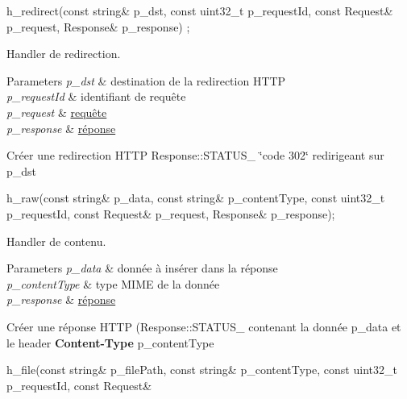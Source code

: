 \begin{DoxyItemize}
\item 
\begin{DoxyCode}
h\_redirect(\textcolor{keyword}{const} \textcolor{keywordtype}{string}& p\_dst, \textcolor{keyword}{const} uint32\_t p\_requestId, \textcolor{keyword}{const} Request& p\_request, Response& p\_response)
      ; 
\end{DoxyCode}
 Handler de redirection. 
\begin{DoxyParams}{Parameters}
{\em p\-\_\-dst} & destination de la redirection H\-T\-T\-P \\
\hline
{\em p\-\_\-request\-Id} & identifiant de requête \\
\hline
{\em p\-\_\-request} & \hyperlink{classxtd_1_1network_1_1http_1_1Request}{requête} \\
\hline
{\em p\-\_\-response} & \hyperlink{classxtd_1_1network_1_1http_1_1Response}{réponse}\\
\hline
\end{DoxyParams}
Créer une redirection H\-T\-T\-P Response\-::\-S\-T\-A\-T\-U\-S\-\_ \char`\"{}code 302\char`\"{} redirigeant sur p\-\_\-dst
\item 
\begin{DoxyCode}
h\_raw(\textcolor{keyword}{const} \textcolor{keywordtype}{string}& p\_data, \textcolor{keyword}{const} \textcolor{keywordtype}{string}& p\_contentType, \textcolor{keyword}{const} uint32\_t p\_requestId, \textcolor{keyword}{const} Request& 
      p\_request, Response& p\_response); 
\end{DoxyCode}
 Handler de contenu. 
\begin{DoxyParams}{Parameters}
{\em p\-\_\-data} & donnée à insérer dans la réponse \\
\hline
{\em p\-\_\-content\-Type} & type M\-I\-M\-E de la donnée \\
\hline
{\em p\-\_\-response} & \hyperlink{classxtd_1_1network_1_1http_1_1Response}{réponse}\\
\hline
\end{DoxyParams}
Créer une réponse H\-T\-T\-P (Response\-::\-S\-T\-A\-T\-U\-S\-\_ contenant la donnée p\-\_\-data et le header {\bfseries Content-\/\-Type} p\-\_\-content\-Type
\item 
\begin{DoxyCode}
h\_file(\textcolor{keyword}{const} \textcolor{keywordtype}{string}& p\_filePath, \textcolor{keyword}{const} \textcolor{keywordtype}{string}& p\_contentType, \textcolor{keyword}{const} uint32\_t p\_requestId, \textcolor{keyword}{const} Request& 

\end{DoxyCode}
\end{DoxyItemize}
